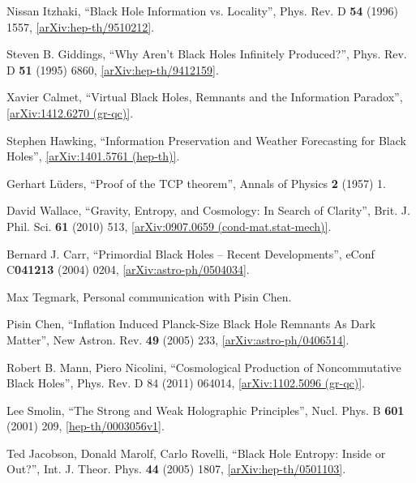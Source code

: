 \documentclass[12pt]{article}
\newcommand{\2}{$^2$}
\newcommand{\3}{$^3$}
\newcommand{\4}{$_4$}
\newcommand{\5}{$_5$}
\begin{document}
\begin{thebibliography}{400}
Nissan Itzhaki, ``Black Hole Information vs. Locality'', 	Phys. Rev. D \textbf{54} (1996) 1557, \href{http://arxiv.org/abs/hep-th/9510212v2}{[arXiv:hep-th/9510212]}.

 Steven B. Giddings, ``Why Aren't Black Holes Infinitely Produced?'', 	Phys. Rev. D \textbf{51} (1995) 6860, \href{http://arxiv.org/abs/hep-th/9412159}{[arXiv:hep-th/9412159]}. 

 Xavier Calmet, ``Virtual Black Holes, Remnants and the Information Paradox'', \href{http://arxiv.org/abs/1412.6270}{[arXiv:1412.6270 (gr-qc)]}.

 Stephen Hawking, ``Information Preservation and Weather Forecasting for Black Holes'', \href{http://arxiv.org/abs/1401.5761}{[arXiv:1401.5761 (hep-th)]}.

 Gerhart L\"uders, ``Proof of the TCP theorem'', Annals of Physics \textbf{2} (1957) 1.

 David Wallace, ``Gravity, Entropy, and Cosmology: In Search of Clarity'', Brit. J. Phil. Sci. \textbf{61} (2010) 513, \href{http://arxiv.org/abs/0907.0659}{[arXiv:0907.0659 (cond-mat.stat-mech)]}.

Bernard J. Carr, ``Primordial Black Holes -- Recent Developments'', eConf C\textbf{041213} (2004) 0204, \href{http://arxiv.org/abs/astro-ph/0504034}{[arXiv:astro-ph/0504034]}. 

 Max Tegmark, Personal communication with Pisin Chen.

 Pisin Chen, ``Inflation Induced Planck-Size Black Hole Remnants As Dark Matter'', New Astron. Rev. \textbf{49} (2005) 233, \href{http://arxiv.org/abs/astro-ph/0406514}{[arXiv:astro-ph/0406514]}.

Robert B. Mann, Piero Nicolini, ``Cosmological Production of Noncommutative Black Holes'', Phys. Rev. D 84 (2011) 064014, \href{http://arxiv.org/abs/1102.5096}{[arXiv:1102.5096 (gr-qc)]}.

 Lee Smolin, ``The Strong and Weak Holographic Principles'', Nucl. Phys. B \textbf{601} (2001) 209, \href{http://arxiv.org/abs/hep-th/0003056}{[hep-th/0003056v1]}.

Ted Jacobson, Donald Marolf, Carlo Rovelli, ``Black Hole Entropy: Inside or Out?'', Int. J. Theor. Phys. \textbf{44} (2005) 1807, \href{http://arxiv.org/abs/hep-th/0501103}{[arXiv:hep-th/0501103]}.


\end{thebibliography}
\end{document}
